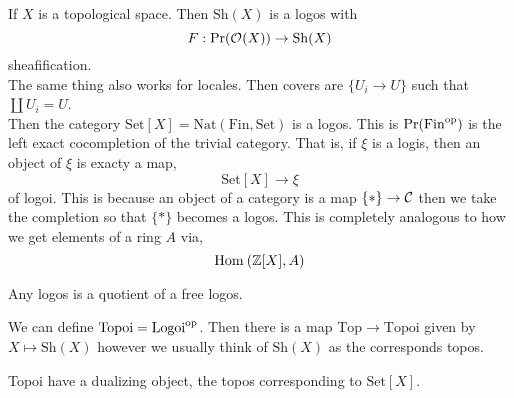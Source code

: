 \documentclass[12pt]{article}
\begin{document}
\begin{example}
If $X$ is a topological space. Then $\mathrm{Sh}(X)$ is a logos with  \[ F : \mathrm{Pr}(\mathcal{O}_{}(X)) \to \mathrm{Sh}(X) \]
sheafification. 
\bigskip\\
The same thing also works for locales. Then covers are $\{ U_i \to U \}$ such that $\coprod U_i = U$.
\bigskip\\
Then the category $\mathrm{Set}[X] = \mathrm{Nat}(\mathrm{Fin}, \mathrm{Set})$ is a logos. This is $\mathrm{Pr}(\mathrm{Fin}^{\mathrm{op}})$ is the left exact cocompletion of the trivial category. That is, if $\xi$ is a logis, then an object of $\xi$ is exacty a map,
\[ \mathrm{Set}[X] \to \xi \]
of logoi. This is because an object of a category is a map $\{ * \} \to \mathcal{C}$ then we take the completion so that $\{ * \}$ becomes a logos. This is completely analogous to how we get elements of a ring $A$ via,
\[ \mathrm{Hom}_{} \left( \mathbb{Z}[X], A \right) \]
\end{example}

\begin{rmk}
Any logos is a quotient of a free logos. 
\end{rmk}

\begin{defn}
We can define $\mathrm{Topoi} = \mathrm{Logoi}^{\mathrm{op}}$. Then there is a map $\mathrm{Top} \to \mathrm{Topoi}$ given by $X \mapsto \mathrm{Sh}(X)$ however we usually think of $\mathrm{Sh}(X)$ as the corresponds topos. 
\end{defn}

\begin{rmk}
Topoi have a dualizing object, the topos corresponding to $\mathrm{Set}[X]$. 
\end{rmk}
\end{document}
